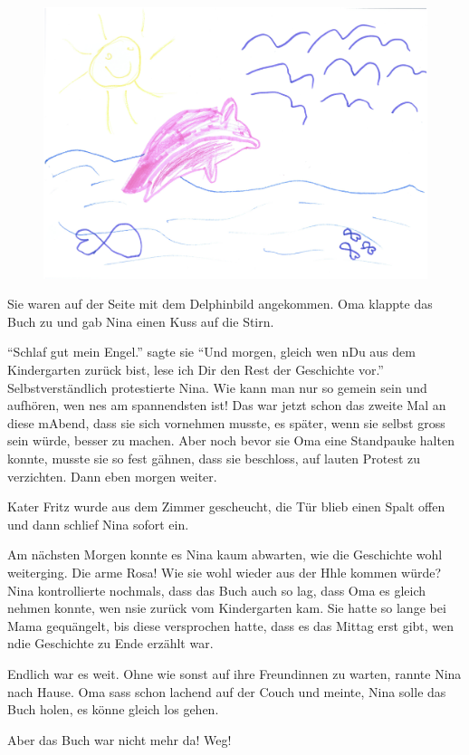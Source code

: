 \medskip
\begin{figure}[hb]
\centering
\includegraphics[width=.7\textwidth]{bilder/oma1.pdf}
\end{figure}
\medskip
\begin{mdframed}[style=mystyle]
Sie waren auf der Seite mit dem Delphinbild angekommen. Oma klappte das Buch zu und gab Nina einen Kuss auf die Stirn.

\enquote{Schlaf gut mein Engel.} sagte sie \enquote{Und morgen, gleich wen nDu aus dem Kindergarten zurück bist, lese ich Dir den Rest der Geschichte vor.} Selbstverständlich protestierte Nina. Wie kann man nur so gemein sein und aufhören, wen nes am spannendsten ist! Das war jetzt schon das zweite Mal an diese mAbend, dass sie sich vornehmen musste, es später, wenn sie selbst gross sein würde, besser zu machen. Aber noch bevor sie Oma eine Standpauke halten konnte, musste sie so fest gähnen, dass sie beschloss, auf lauten Protest zu verzichten. Dann eben morgen weiter.

Kater Fritz wurde aus dem Zimmer gescheucht, die Tür blieb einen Spalt offen und dann schlief Nina sofort ein.

Am nächsten Morgen konnte es Nina kaum abwarten, wie die Geschichte wohl weiterging. Die arme Rosa! Wie sie wohl wieder aus der Hhle kommen würde? Nina kontrollierte nochmals, dass das Buch auch so lag, dass Oma es gleich nehmen konnte, wen nsie zurück vom Kindergarten kam. Sie hatte so lange bei Mama gequängelt, bis diese versprochen hatte, dass es das Mittag erst gibt, wen ndie Geschichte zu Ende erzählt war.

Endlich war es weit. Ohne wie sonst auf ihre Freundinnen zu warten, rannte Nina nach Hause. Oma sass schon lachend auf der Couch und meinte, Nina solle das Buch holen, es könne gleich los gehen.

Aber das Buch war nicht mehr da! Weg!


\end{mdframed}
